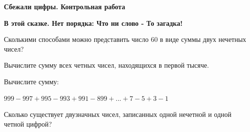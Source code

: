 \centerline{\bf \Huge Сбежали цифры. Контрольная работа}
\centerline{\bf \Huge }

\begin{flushright}
        \scriptsize{\textbf{В этой сказке. Нет порядка: Что ни слово - То загадка!}}
\end{flushright}


 Сколькими способами можно представить число 60 в виде суммы двух нечетных чисел?

 Вычислите сумму всех четных чисел, находящихся в первой тысяче.

 Вычислите сумму:

$999-997+995-993+991-899+...+7-5+3-1$

 Сколько существует двузначных чисел, записанных одной нечетной и одной четной цифрой? 



